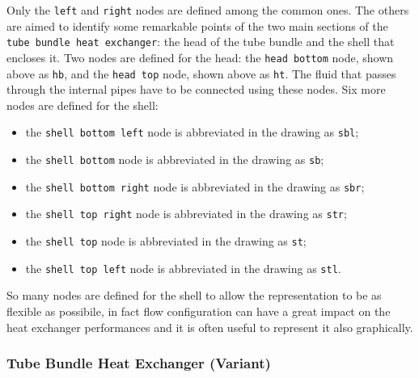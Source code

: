\documentclass[12pt]{article}						%
\newcommand*{\chpn}[1]{\texttt{#1}}				%
\newcommand*{\chpp}[1]{\texttt{#1}}				%
\begin{document}
Only the \chpn{left} and \chpn{right} nodes are defined among the common ones.
The others are aimed to identify some remarkable points of the two main sections
of the \chpp{tube bundle heat exchanger}: the head of the tube bundle and the
shell that encloses it. Two nodes are defined for the head: the
\chpn{head bottom} node, shown above as \chpn{hb}, and the \chpn{head top} node,
shown above as \chpn{ht}. The fluid that passes through the internal pipes have
to be connected using these nodes. Six more nodes are defined for the shell:
\begin{itemize}
	\item the \chpn{shell bottom left} node is abbreviated in the drawing as
		\chpn{sbl};
	\item the \chpn{shell bottom} node is abbreviated in the drawing as
		\chpn{sb};
	\item the \chpn{shell bottom right} node is abbreviated in the drawing as
		\chpn{sbr};
	\item the \chpn{shell top right} node is abbreviated in the drawing as
		\chpn{str};
	\item the \chpn{shell top} node is abbreviated in the drawing as
		\chpn{st};
	\item the \chpn{shell top left} node is abbreviated in the drawing as
		\chpn{stl}.
\end{itemize}
So many nodes are defined for the shell to allow the representation to be as
flexible as possibile, in fact flow configuration can have a great impact on
the heat exchanger performances and it is often useful to represent it also
graphically.

\subsubsection{Tube Bundle Heat Exchanger (Variant)}
\end{document}
